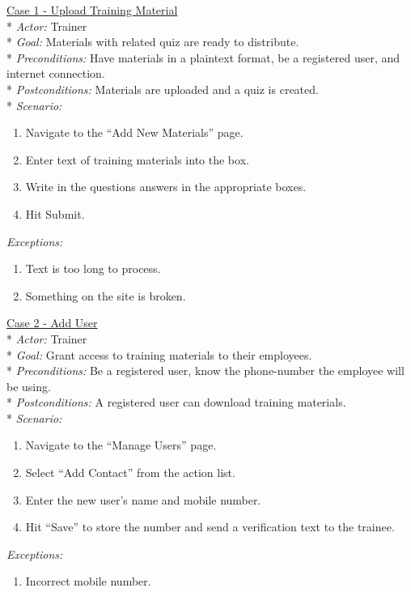 \underline{Case 1 - Upload Training Material}\\*
\textit{Actor:} Trainer\\*
\textit{Goal:} Materials with related quiz are ready to distribute.\\*
\textit{Preconditions:} Have materials in a plaintext format, be a registered user, and internet connection.\\*
\textit{Postconditions:} Materials are uploaded and a quiz is created.\\*
\textit{Scenario:}
\begin{enumerate}
	\item{Navigate to the “Add New Materials” page.}
	\item{Enter text of training materials into the box.}
	\item{Write in the questions answers in the appropriate boxes.}
	\item{Hit Submit.}
\end{enumerate}
\textit{Exceptions:}
\begin{enumerate}
	\item{Text is too long to process.}
	\item{Something on the site is broken.}\\
\end{enumerate}

\underline{Case 2 - Add User}\\*
\textit{Actor:} Trainer\\*
\textit{Goal:} Grant access to training materials to their employees.\\*
\textit{Preconditions:} Be a registered user, know the phone-number the employee will be using.\\*
\textit{Postconditions:} A registered user can download training materials.\\*
\textit{Scenario:}
\begin{enumerate}
	\item{Navigate to the ``Manage Users'' page.}
	\item{Select “Add Contact” from the action list.}
	\item{Enter the new user’s name and mobile number.}
	\item{Hit ``Save'' to store the number and send a verification text to the trainee.}
\end{enumerate}
\textit{Exceptions:}
\begin{enumerate}
	\item{Incorrect mobile number.}\\
\end{enumerate}

